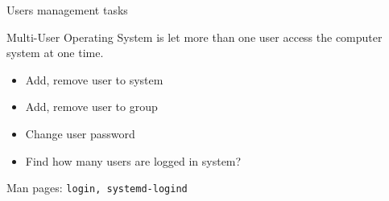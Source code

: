 \begin{frame}[fragile]{Users management tasks}
\begin{block}{Multi-User Operating System}
is let more than one user access the computer system at one time.
\end{block}
  \begin{itemize}
    \item Add, remove user to system 
    \item Add, remove user to group
    \item Change user password
    \item Find how many users are logged in system?
  \end{itemize}
 Man pages:  \verb|login, systemd-logind|
\end{frame}
